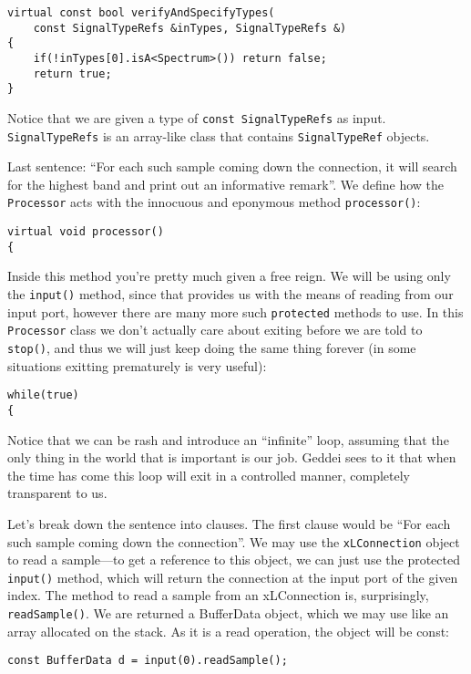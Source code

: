 \begin{verbatim}
virtual const bool verifyAndSpecifyTypes(
    const SignalTypeRefs &inTypes, SignalTypeRefs &)
{
    if(!inTypes[0].isA<Spectrum>()) return false;
    return true;
}
\end{verbatim}

Notice that we are given a type of \texttt{const SignalTypeRefs} as input. \texttt{SignalTypeRefs} is an array-like class that contains \texttt{SignalTypeRef} objects.

Last sentence: ``For each such sample coming down the connection, it will search for the highest band and print out an informative remark''. We define how the \texttt{Processor} acts with the innocuous and eponymous method \texttt{processor()}:

\begin{verbatim}
virtual void processor()
{
\end{verbatim}

Inside this method you're pretty much given a free reign. We will be using only the \texttt{input()} method, since that provides us with the means of reading from our input port, however there are many more such \texttt{protected} methods to use. In this \texttt{Processor} class we don't actually care about exiting before we are told to \texttt{stop()}, and thus we will just keep doing the same thing forever (in some situations exitting prematurely is very useful):

\begin{verbatim}
while(true)
{
\end{verbatim}

Notice that we can be rash and introduce an ``infinite'' loop, assuming that the only thing in the world that is important is our job. Geddei sees to it that when the time has come this loop will exit in a controlled manner, completely transparent to us.

Let's break down the sentence into clauses. The first clause would be ``For each such sample coming down the connection''. We may use the \texttt{xLConnection} object to read a sample---to get a reference to this object, we can just use the protected \texttt{input()} method, which will return the connection at the input port of the given index. The method to read a sample from an xLConnection is, surprisingly, \texttt{readSample()}. We are returned a BufferData object, which we may use like an array allocated on the stack. As it is a read operation, the object will be const:

\begin{verbatim}
const BufferData d = input(0).readSample();
\end{verbatim}

